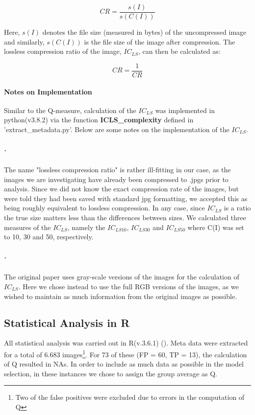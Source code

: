 \documentclass[12pt]{article}
\begin{document}
\begin{equation}
	CR = \frac{s(I)}{s(C(I))}
	\label{eq:CR1}
\end{equation} 

Here, $s(I)$ denotes the file size (measured in bytes) of the uncompressed image and similarly, $s(C(I))$ is the file size of the image after compression. The lossless compression ratio of the image, $IC_{LS}$, can then be calculated as:

\begin{equation}
	CR = \frac{1}{CR}
	\label{eq:CR2}
\end{equation} 

\paragraph{Notes on Implementation}
Similar to the Q-measure, calculation of the $IC_{LS}$ was implemented in python(v3.8.2) via the function \textbf{ICLS\_complexity} defined in 'extract\_metadata.py'. Below are some notes on the implementation of the $IC_{LS}$.
\subparagraph{.}
The name "lossless compression ratio" is rather ill-fitting in our case, as the images we are investigating have already been compressed to .jpgs prior to analysis. Since we did not know the exact compression rate of the images, but were told they had been saved with standard jpg formatting, we accepted this as being roughly equivalent to lossless compression. In any case, since $IC_{LS}$ is a ratio the true size matters less than the differences between sizes. We calculated three measures of the $IC_{LS}$, namely the $IC_{LS10}$, $IC_{LS30}$ and $IC_{LS50}$ where C(I) was set to 10, 30 and 50, respectively.

\subparagraph{.}
The original paper uses gray-scale versions of the images for the calculation of $IC_{LS}$. Here we chose instead to use the full RGB versions of the images, as we wished to maintain as much information from the original images as possible.

\subsection{Statistical Analysis in R}\label{R}
All statistical analysis was carried out in R(v.3.6.1) (\cite{rcoreteamLanguageEnvironmentStatistical2020}). Meta data were extracted for a total of 6.683 images\footnote{Two of the false positives were excluded due to errors in the computation of Q}. For 73 of these (FP = 60, TP = 13), the calculation of Q resulted in NAs. In order to include as much data as possible in the model selection, in these instances we chose to assign the group average as Q.
\end{document}
